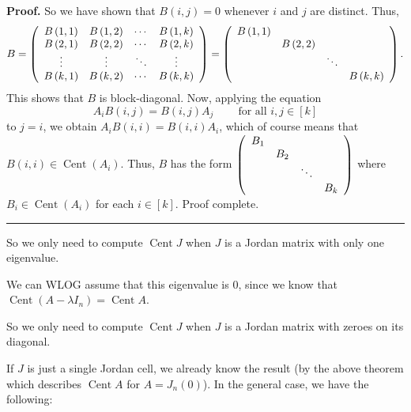 \documentclass[numbers=enddot,12pt,final,onecolumn,notitlepage]{scrartcl}%
\numberwithin{exer}{subsection}
\theoremstyle{definition}
\newenvironment{proof}[1][Proof]{\noindent\textbf{#1.} }{\ \rule{0.5em}{0.5em}}
\begin{document}
\begin{proof}
So we have shown that $B\left(  i,j\right)  =0$ whenever $i$ and $j$ are
distinct. Thus,%
\[
B=\left(
\begin{array}
[c]{cccc}%
B\left(  1,1\right)  & B\left(  1,2\right)  & \cdots & B\left(  1,k\right) \\
B\left(  2,1\right)  & B\left(  2,2\right)  & \cdots & B\left(  2,k\right) \\
\vdots & \vdots & \ddots & \vdots\\
B\left(  k,1\right)  & B\left(  k,2\right)  & \cdots & B\left(  k,k\right)
\end{array}
\right)  =\left(
\begin{array}
[c]{cccc}%
B\left(  1,1\right)  &  &  & \\
& B\left(  2,2\right)  &  & \\
&  & \ddots & \\
&  &  & B\left(  k,k\right)
\end{array}
\right)  .
\]
This shows that $B$ is block-diagonal. Now, applying the equation%
\[
A_{i}B\left(  i,j\right)  =B\left(  i,j\right)  A_{j}%
\ \ \ \ \ \ \ \ \ \ \text{for all }i,j\in\left[  k\right]
\]
to $j=i$, we obtain $A_{i}B\left(  i,i\right)  =B\left(  i,i\right)  A_{i}$,
which of course means that $B\left(  i,i\right)  \in\operatorname*{Cent}%
\left(  A_{i}\right)  $. Thus, $B$ has the form $\left(
\begin{array}
[c]{cccc}%
B_{1} &  &  & \\
& B_{2} &  & \\
&  & \ddots & \\
&  &  & B_{k}%
\end{array}
\right)  $ where $B_{i}\in\operatorname*{Cent}\left(  A_{i}\right)  $ for each
$i\in\left[  k\right]  $. Proof complete.
\end{proof}

So we only need to compute $\operatorname*{Cent}J$ when $J$ is a Jordan matrix
with only one eigenvalue.

We can WLOG assume that this eigenvalue is $0$, since we know that
$\operatorname*{Cent}\left(  A-\lambda I_{n}\right)  =\operatorname*{Cent}A$.

So we only need to compute $\operatorname*{Cent}J$ when $J$ is a Jordan matrix
with zeroes on its diagonal.

If $J$ is just a single Jordan cell, we already know the result (by the above
theorem which describes $\operatorname*{Cent}A$ for $A=J_{n}\left(  0\right)
$). In the general case, we have the following:
\end{document}
